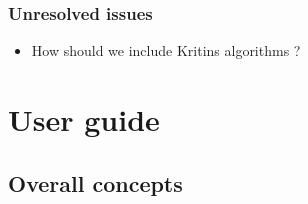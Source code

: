 \maketitle  

\tableofcontents

\section{Unresolved issues}

\begin{itemize}

  \item How should we include Kritins algorithms ?

  
\end{itemize}

\part{User guide }

\chapter{Overall concepts}

